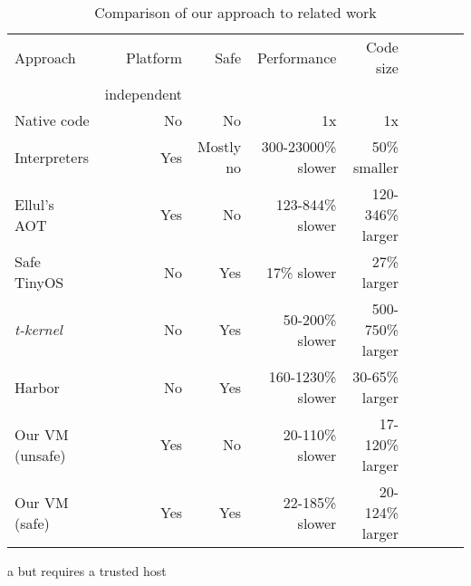 \begin{table*}[]
\centering
\caption{Comparison of our approach to related work}
\label{tbl-contribution-comparison}
\begin{threeparttable}
\begin{tabular}{lrrrrrrrr}
\toprule
Approach        & Platform    & Safe               & Performance        & Code size               \\
                & independent &                    &                    & \\
\midrule
Native code     & No          & No                 & 1x                 & 1x                      \\
Interpreters    & Yes         & Mostly no          & 300-23000\% slower & ~50\% smaller           \\
Ellul's AOT     & Yes         & No                 & 123-844\% slower   & 120-346\% larger        \\
Safe TinyOS     & No          & Yes\tnote{a}       & 17\% slower        & 27\% larger             \\
\emph{t-kernel} & No          & Yes                & 50-200\% slower    & 500-750\% larger        \\
Harbor          & No          & Yes                & 160-1230\% slower  & 30-65\% larger          \\
Our VM (unsafe) & Yes         & No                 & 20-110\% slower    & 17-120\% larger         \\
Our VM (safe)   & Yes         & Yes                & 22-185\% slower    & 20-124\% larger         \\
\bottomrule
\end{tabular}
\begin{tablenotes}
	\item[a] but requires a trusted host
\end{tablenotes}
\end{threeparttable}
\end{table*}
